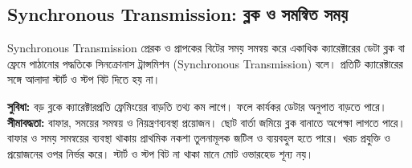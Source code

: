\subsection{Synchronous Transmission: ব্লক ও সমন্বিত সময়}
\label{ch2:c02-05}
\begin{definitionbox}{Synchronous Transmission}
প্রেরক ও প্রাপকের বিটের সময় সমন্বয় করে একাধিক ক্যারেক্টারের ডেটা ব্লক বা ফ্রেমে পাঠানোর পদ্ধতিকে সিনক্রোনাস ট্রান্সমিশন (Synchronous Transmission) বলে। প্রতিটি ক্যারেক্টারের সঙ্গে আলাদা স্টার্ট ও স্টপ বিট দিতে হয় না।
\end{definitionbox}
\textbf{সুবিধা:} বড় ব্লকে ক্যারেক্টারপ্রতি ফ্রেমিংয়ের বাড়তি তথ্য কম লাগে। ফলে কার্যকর ডেটার অনুপাত বাড়তে পারে। \textbf{সীমাবদ্ধতা:} বাফার, সময়ের সমন্বয় ও নিয়ন্ত্রণব্যবস্থা প্রয়োজন। ছোট বার্তা জমিয়ে ব্লক বানাতে অপেক্ষা লাগতে পারে। বাফার ও সময় সমন্বয়ের ব্যবস্থা থাকায় প্রাথমিক নকশা তুলনামূলক জটিল ও ব্যয়বহুল হতে পারে। খরচ প্রযুক্তি ও প্রয়োজনের ওপর নির্ভর করে। স্টার্ট ও স্টপ বিট না থাকা মানে মোট ওভারহেড শূন্য নয়।

